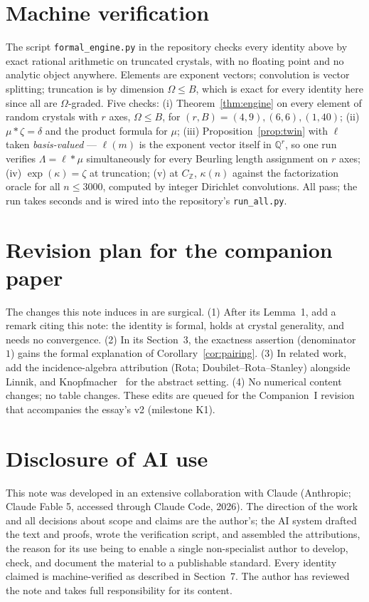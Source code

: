 \documentclass[11pt]{article}
\theoremstyle{remark}
\newcommand{\Q}{\mathbb{Q}}
\newcommand{\Z}{\mathbb{Z}}
\begin{document}
\section{Machine verification}

The script \texttt{formal\_engine.py} in the repository \cite{Code} checks every identity above by
exact rational arithmetic on truncated crystals, with no floating point and no analytic object
anywhere. Elements are exponent vectors; convolution is vector splitting; truncation is by
dimension $\Omega \le B$, which is exact for every identity here since all are $\Omega$-graded.
Five checks: (i) Theorem~\ref{thm:engine} on every element of random crystals with $r$ axes,
$\Omega \le B$, for $(r, B) = (4, 9), (6, 6), (1, 40)$; (ii) $\mu * \zeta = \delta$ and the
product formula for $\mu$; (iii) Proposition~\ref{prop:twin} with $\ell$ taken \emph{basis-valued}
--- $\ell(m)$ is the exponent vector itself in $\Q^r$, so one run verifies $\Lambda = \ell * \mu$
simultaneously for every Beurling length assignment on $r$ axes; (iv) $\exp(\kappa) = \zeta$ at
truncation; (v) at $C_\Z$, $\kappa(n)$ against the factorization oracle for all $n \le 3000$,
computed by integer Dirichlet convolutions. All pass; the run takes seconds and is wired into the
repository's \texttt{run\_all.py}.

\section{Revision plan for the companion paper}

The changes this note induces in \cite{CompanionI} are surgical. (1) After its Lemma~1, add a
remark citing this note: the identity is formal, holds at crystal generality, and needs no
convergence. (2) In its Section~3, the exactness assertion (denominator~$1$) gains the formal
explanation of Corollary~\ref{cor:pairing}. (3) In related work, add the incidence-algebra
attribution (Rota; Doubilet--Rota--Stanley) alongside Linnik, and Knopfmacher~\cite{Knopfmacher}
for the abstract setting. (4) No numerical content changes; no table changes. These edits are queued for the
Companion~I revision that accompanies the essay's v2 (milestone K1).

\section*{Disclosure of AI use}

This note was developed in an extensive collaboration with Claude (Anthropic; Claude Fable 5,
accessed through Claude Code, 2026). The direction of the work and all decisions about scope and
claims are the author's; the AI system drafted the text and proofs, wrote the verification script,
and assembled the attributions, the reason for its use being to enable a single non-specialist
author to develop, check, and document the material to a publishable standard. Every identity
claimed is machine-verified as described in Section~7. The author has reviewed the note and takes
full responsibility for its content.
\end{document}
